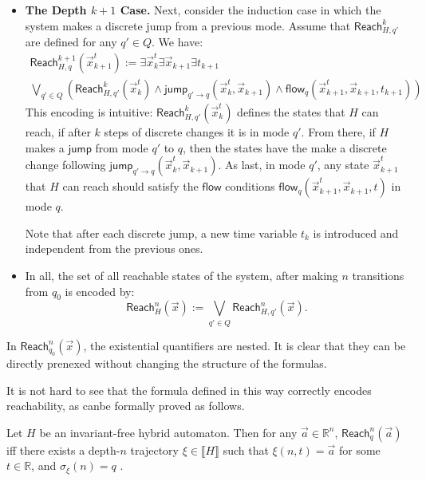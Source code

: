 \documentclass[envcountsect]{llncs}
\newcommand{\flow}{\mathsf{flow}}
\newcommand{\jump}{\mathsf{jump}}
\newcommand{\reach}{\mathsf{Reach}}
\begin{document}
\begin{definition}[$\reach_H^n(\vec x)$, Invariant-Free Case]
\begin{itemize}
\item {\bf The Depth $k+1$ Case.} Next, consider the induction case in which
the system makes a discrete jump from a previous mode. Assume that
$\reach^k_{H,q'}$ are defined for any $q'\in Q$. We have:
\begin{multline*}
\reach^{k+1}_{H,q}(\vec x_{k+1}^t):=  \exists \vec x_k^t\exists \vec
x_{k+1}\exists t_{k+1}\ \\
\bigvee_{q'\in Q} (\reach^k_{H,q'} (\vec x_k^t) \wedge \jump_{q'\rightarrow
q}(\vec x_k^t, \vec x_{k+1}) \wedge \flow_{q}(\vec x_{k+1}^t, \vec x_{k+1},
t_{k+1}))
\end{multline*}
This encoding is intuitive: $\reach_{H,q'}^k(\vec x_k^t)$ defines the states
that $H$ can reach, if after $k$ steps of discrete changes it is in mode $q'$.
From there, if $H$ makes a $\jump$ from mode $q'$ to $q$, then the states have
the make a discrete change following $\jump_{q'\rightarrow q}(\vec x_k^t, \vec
x_{k+1})$. As last, in mode $q'$, any state $\vec x_{k+1}^t$ that $H$ can reach
should satisfy the $\flow$ conditions $\flow_q(\vec x_{k+1}^t, \vec x_{k+1}, t)$
in mode $q$.

Note that after each discrete jump, a new time variable $t_k$ is introduced and
independent from the previous ones.

\item In all, the set of all reachable states of the system, after making $n$
transitions from $q_0$ is encoded by: 
$$\reach^n_{H}(\vec x) := \bigvee_{q'\in Q} \reach^n_{H,q'}(\vec x).$$


\end{itemize}
\end{definition}

\begin{remark}
In $\reach_{q_0}^n(\vec x)$, the existential quantifiers are nested. It is
clear that they can be directly prenexed without changing the structure of the
formulas. 
\end{remark}

It is not hard to see that the formula defined in this way correctly encodes
reachability, as canbe formally proved as follows. 

\begin{proposition}
Let $H$ be an invariant-free hybrid automaton. Then for any $\vec a\in
\mathbb{R}^n$, $\reach^n_q(\vec a)$ iff there exists a depth-$n$ trajectory
$\xi\in\llbracket H\rrbracket$ such that $\xi(n, t) = \vec a$ for some
$t\in\mathbb{R}$, and $\sigma_{\xi}(n) = q$ . 
\end{proposition}
\end{document}
